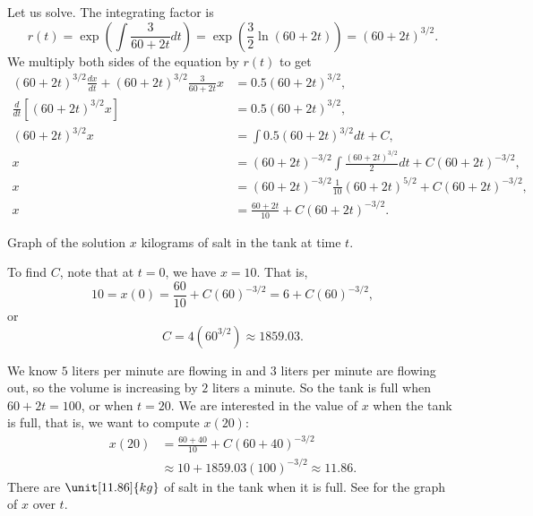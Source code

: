 \begin{example}
Let us solve.  The integrating factor is
\begin{equation*}
r(t) = \exp \left( \int \frac{3}{60+2t} dt  \right)
=
\exp \left( \frac{3}{2} \ln (60+2t) \right)
=
{(60+2t)}^{3/2} .
\end{equation*}
We multiply both sides of the equation by $r(t)$ to get
\begin{align*}
{(60+2t)}^{3/2} \frac{dx}{dt} +
{(60+2t)}^{3/2} \frac{3}{60+2t} x
& =
0.5{(60+2t)}^{3/2} ,\\
\frac{d}{dt}\left[
{(60+2t)}^{3/2} x \right]
& =
0.5{(60+2t)}^{3/2} ,\\
{(60+2t)}^{3/2} x
& =
\int 
0.5{(60+2t)}^{3/2}
dt
+C ,\\
 x
& =
{(60+2t)}^{-3/2} \int 
\frac{
{(60+2t)}^{3/2}
}{2}
dt
+C{(60+2t)}^{-3/2} ,\\
 x
& =
{(60+2t)}^{-3/2}
\frac{1}{10}{(60+2t)}^{5/2}
+C{(60+2t)}^{-3/2} ,\\
 x
& =
\frac{60+2t}{10}
+C{(60+2t)}^{-3/2} .
\end{align*}

\begin{mywrapfig}{3.25in}
\capstart
{}
\caption{Graph of the solution $x$ kilograms of salt in the tank at time
$t$.\label{linear-salt-graph:fig}}
\end{mywrapfig}
%
%
To find $C$, note that at $t=0$, we have $x=10$.  That is,
\begin{equation*}
10 = x(0)
=
\frac{60}{10}
+C{(60)}^{-3/2}
=
6
+C{(60)}^{-3/2} ,
\end{equation*}
or
\begin{equation*}
C=4 ({60}^{3/2}) \approx 1859.03 .
\end{equation*}

We know $5$ liters per minute are flowing in and $3$ liters per minute are flowing out,
so the volume is increasing by $2$ liters a minute.
So the tank is
full when $60+2t = 100$, or when $t=20$.
We are interested in the value of $x$ when the tank is full,
that is, we want to compute $x(20)$:
\begin{equation*}
\begin{split}
x(20) & = 
\frac{60+40}{10}
+C{(60+40)}^{-3/2}
\\
& \approx
10
+1859.03 {(100)}^{-3/2}
\approx
11.86 .
\end{split}
\end{equation*}
There are $\unit[11.86]{kg}$ of salt in the tank when it is full.
See  for the graph of $x$ over $t$.


\end{example}
